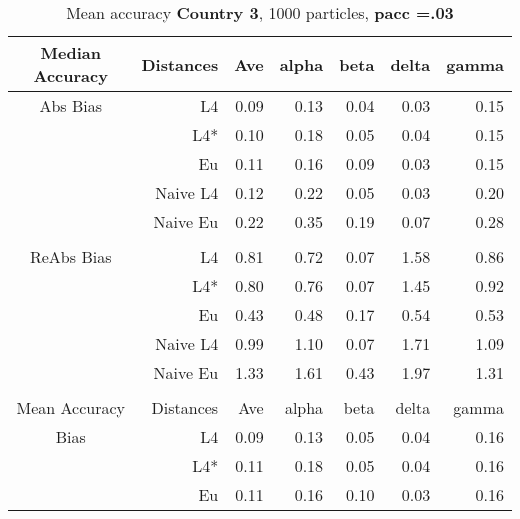 \documentclass[a4paper,12pt,twoside]{book}
\begin{document}

\begin{table}[H]

\centering
\vfill
\caption{Mean  accuracy \textbf{Country 3}, 1000 particles, \textbf{pacc =.03}}


\begin{tabular}{crrrrrr}
  \hline
  
{\color{blue}Median Accuracy} & Distances & Ave & alpha & beta & delta & gamma \\ 
  \hline
{\color{blue}Abs Bias}& L4  &0.09 & 0.13 & 0.04 & 0.03 & 0.15 \\ 
 
 &L4*  &  0.10 & 0.18 & 0.05 & 0.04 & 0.15 \\ 
 
 
&Eu &    0.11 & 0.16 & 0.09 & 0.03 & 0.15 \\ 
  
 
&Naive L4&       
  0.12 & 0.22 & 0.05 & 0.03 & 0.20 \\ 
&Naive Eu &    0.22 & 0.35 & 0.19 & 0.07 & 0.28 \\ 
 
  
  \\ 
   \hline
   
{\color{blue} ReAbs Bias } & L4  &0.81 & 0.72 & 0.07 & 1.58 & 0.86 \\ 
 
&L4*  &  0.80 & 0.76 & 0.07 & 1.45 & 0.92 \\ 
  
&Eu &   
 0.43 & 0.48 & 0.17 & 0.54 & 0.53 \\ 
  
 
  
&Naive L4&   
  0.99 & 1.10 & 0.07 & 1.71 & 1.09 \\ 
 
&Naive Eu &    1.33 & 1.61 & 0.43 & 1.97 & 1.31 \\ 
 
   \\ 
   \hline
{\color{blue}Mean Accuracy} & Distances & Ave & alpha & beta & delta & gamma \\ 
  \hline
{\color{blue}Bias} & L4  &0.09 & 0.13 & 0.05 & 0.04 & 0.16 \\ 
 
   \hline
&L4*  & 0.11 & 0.18 & 0.05 & 0.04 & 0.16 \\ 
 
&Eu &   0.11 & 0.16 & 0.10 & 0.03 & 0.16 \\ 
 

\end{tabular}
\end{table}
\end{document}
